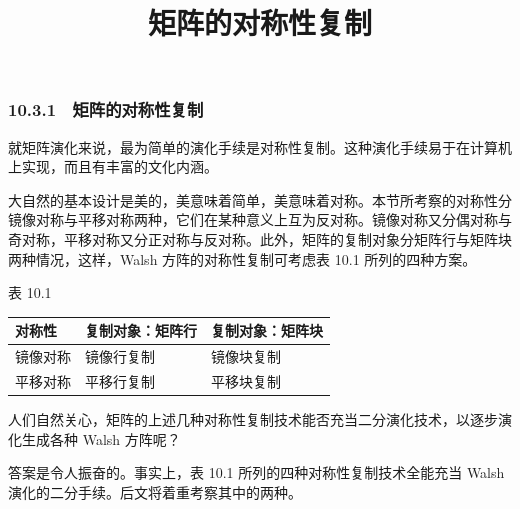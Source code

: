 \documentclass[
  10pt,
  fontset=fandol]{ctexart}
\title{矩阵的对称性复制}
\author{}
\date{}
\newcounter{none} %
\begin{document}
\maketitle

\subsubsection{10.3.1　矩阵的对称性复制}\label{ux77e9ux9635ux7684ux5bf9ux79f0ux6027ux590dux5236}

就矩阵演化来说，最为简单的演化手续是对称性复制。这种演化手续易于在计算机上实现，而且有丰富的文化内涵。

大自然的基本设计是美的，美意味着简单，美意味着对称。本节所考察的对称性分镜像对称与平移对称两种，它们在某种意义上互为反对称。镜像对称又分偶对称与奇对称，平移对称又分正对称与反对称。此外，矩阵的复制对象分矩阵行与矩阵块两种情况，这样，Walsh 方阵的对称性复制可考虑表 10.1 所列的四种方案。

表 10.1

{\def\LTcaptype{none} %
\begin{longtable}[]{@{}lll@{}}
\toprule\noalign{}
对称性 & 复制对象：矩阵行 & 复制对象：矩阵块 \\
\midrule\noalign{}
\endhead
\bottomrule\noalign{}
\endlastfoot
镜像对称 & 镜像行复制 & 镜像块复制 \\
平移对称 & 平移行复制 & 平移块复制 \\
\end{longtable}
}

人们自然关心，矩阵的上述几种对称性复制技术能否充当二分演化技术，以逐步演化生成各种 Walsh 方阵呢？

答案是令人振奋的。事实上，表 10.1 所列的四种对称性复制技术全能充当 Walsh 演化的二分手续。后文将着重考察其中的两种。
\end{document}
